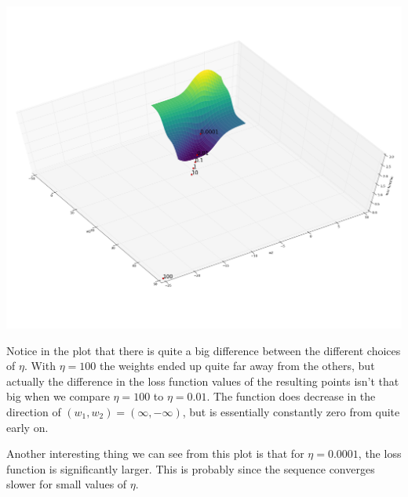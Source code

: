 \documentclass{article}
\begin{document}
\begin{centering}
	\includegraphics[width=\linewidth]{exercise4_task13.png}
\end{centering}

Notice in the plot that there is quite a big difference between the different choices of $\eta$. With $\eta = 100$ the weights ended up quite far away from the others, but actually the difference in the loss function values of the resulting points isn't that big when we compare $\eta = 100$ to $\eta = 0.01$. 
The function does decrease in the direction of $(w_1,w_2) = (\infty,-\infty)$, but is essentially constantly zero from quite early on. 

Another interesting thing we can see from this plot is that for $\eta=0.0001$, the loss function is significantly larger. This is probably since the sequence converges slower for small values of $\eta$. 
\end{document}
